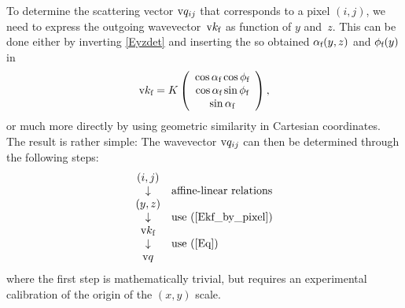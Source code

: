 To determine the scattering vector $\text{v}{q}_{ij}$
that corresponds to a pixel $(i,j)$,
we need to express the outgoing wavevector~$\text{v}{k}_{\text{f}}$ as function of $y$ and~$z$.
This can be done either by inverting \cref{Eyzdet}
and inserting the so obtained $\alpha_{\text{f}}(y,z)$ and $\phi_{\text{f}}(y)$ in
\begin{equation}\label{Ekf_by_angle}
  \text{v}{k}_{\text{f}}=K\left(\begin{array}{c}
   \cos\alpha_{\text{f}}\cos\phi_{\text{f}}\\
   \cos\alpha_{\text{f}}\sin\phi_{\text{f}}\\
   \sin\alpha_{\text{f}}\end{array}\right),
\end{equation}
or much more directly by using geometric similarity in Cartesian coordinates.
The result is rather simple:
The wavevector $\text{v}{q}_{ij}$ can then be determined through the following steps:
\begin{equation}\label{Eqalgo}
  \begin{array}{cl}
      (i,j)&\\
      \downarrow&\mbox{affine-linear relations}\\
      (y,z)\\
      \downarrow&\mbox{use (\protect\ref{Ekf_by_pixel})}\\
      \text{v}{k}_{\text{f}}&\\
      \downarrow&\mbox{use (\protect\ref{Eq})}\\
      \text{v}{q}&\\
  \end{array}
\end{equation}
where the first step is mathematically trivial,
but requires an experimental calibration of the origin of the $(x,y)$ scale.


